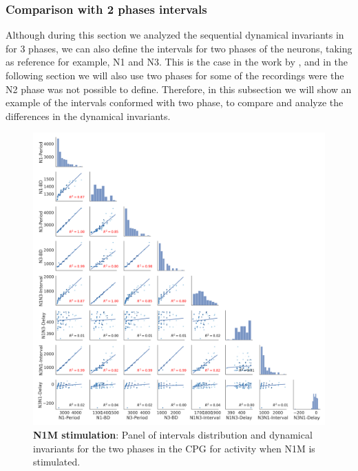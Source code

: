 \subsubsection{Comparison with 2 phases intervals}
Although during this section we analyzed the sequential dynamical invariants in for 3 phases, we can also define the intervals for two phases of the neurons, taking as reference for example, N1 and N3. This is the case in the work by \cite{elices_robust_2019}, and in the following section we will also use two phases for some of the recordings were the N2 phase was not possible to define. Therefore, in this subsection we will show an example of the intervals conformed with two phase, to compare and analyze the differences in the dynamical invariants. 


\begin{figure}[htbp]
	\centering
	\includegraphics[width=\textwidth]{./invariants/data/MODEL/n1m_driven/images/2phases/_output_pairplot.png}
	\caption{\textbf{N1M stimulation}: Panel of intervals distribution and dynamical invariants for the two phases in the CPG for activity when N1M is stimulated.}
	\label{fig:model n1m stimulation pairplot 2phases}
\end{figure}



